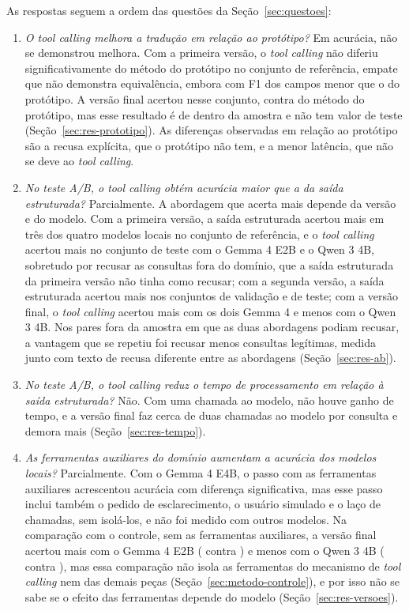 As respostas seguem a ordem das questões da Seção~\ref{sec:questoes}:
\begin{enumerate}
  \item \textit{O tool calling melhora a tradução em relação ao protótipo?} Em acurácia, não se demonstrou melhora. Com a primeira versão, o \textit{tool calling} não diferiu significativamente do método do protótipo no conjunto de referência, empate que não demonstra equivalência, embora com F1 dos campos menor que o do protótipo. A versão final acertou  nesse conjunto, contra  do método do protótipo, mas esse resultado é de dentro da amostra e não tem valor de teste (Seção~\ref{sec:res-prototipo}). As diferenças observadas em relação ao protótipo são a recusa explícita, que o protótipo não tem, e a menor latência, que não se deve ao \textit{tool calling}.
  \item \textit{No teste A/B, o tool calling obtém acurácia maior que a da saída estruturada?} Parcialmente. A abordagem que acerta mais depende da versão e do modelo. Com a primeira versão, a saída estruturada acertou mais em três dos quatro modelos locais no conjunto de referência, e o \textit{tool calling} acertou mais no conjunto de teste com o Gemma 4 E2B e o Qwen 3 4B, sobretudo por recusar as consultas fora do domínio, que a saída estruturada da primeira versão não tinha como recusar; com a segunda versão, a saída estruturada acertou mais nos conjuntos de validação e de teste; com a versão final, o \textit{tool calling} acertou mais com os dois Gemma 4 e menos com o Qwen 3 4B. Nos pares fora da amostra em que as duas abordagens podiam recusar, a vantagem que se repetiu foi recusar menos consultas legítimas, medida junto com texto de recusa diferente entre as abordagens (Seção~\ref{sec:res-ab}).
  \item \textit{No teste A/B, o tool calling reduz o tempo de processamento em relação à saída estruturada?} Não. Com uma chamada ao modelo, não houve ganho de tempo, e a versão final faz cerca de duas chamadas ao modelo por consulta e demora mais (Seção~\ref{sec:res-tempo}).
  \item \textit{As ferramentas auxiliares do domínio aumentam a acurácia dos modelos locais?} Parcialmente. Com o Gemma 4 E4B, o passo com as ferramentas auxiliares acrescentou acurácia com diferença significativa, mas esse passo inclui também o pedido de esclarecimento, o usuário simulado e o laço de chamadas, sem isolá-los, e não foi medido com outros modelos. Na comparação com o controle, sem as ferramentas auxiliares, a versão final acertou mais com o Gemma 4 E2B ( contra ) e menos com o Qwen 3 4B ( contra ), mas essa comparação não isola as ferramentas do mecanismo de \textit{tool calling} nem das demais peças (Seção~\ref{sec:metodo-controle}), e por isso não se sabe se o efeito das ferramentas depende do modelo (Seção~\ref{sec:res-versoes}).
\end{enumerate}

